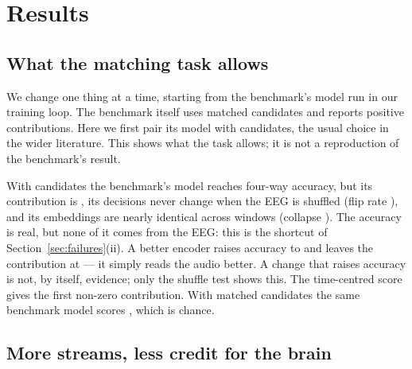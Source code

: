 \section{Results}
\label{sec:results}

\subsection{What the matching task allows}
\label{sec:res-ladder}

We change one thing at a time, starting from the benchmark's model run in our
training loop. The benchmark itself uses matched candidates and reports positive
contributions. Here we first pair its model with \cUnm{} candidates, the usual
choice in the wider literature. This shows what the task allows; it is not a
reproduction of the benchmark's result.

With \cUnm{} candidates the benchmark's model reaches
 four-way accuracy, but its contribution is
, its decisions never change when the EEG
is shuffled (flip rate ), and its
embeddings are nearly identical across windows (collapse
). The accuracy is real, but none of it
comes from the EEG: this is the shortcut of Section~\ref{sec:failures}(ii). A
better encoder raises accuracy to  and leaves
the contribution at  --- it simply reads
the audio better. A change that raises accuracy is not, by itself, evidence; only
the shuffle test shows this. The time-centred score gives the first non-zero
contribution. With matched candidates the same benchmark model scores
, which is chance.

\subsection{More streams, less credit for the brain}
\label{sec:res-hinge}


